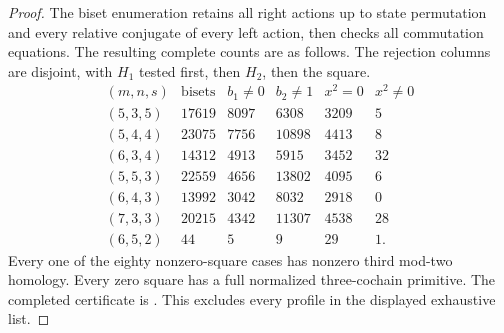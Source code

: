 \begin{proof}
The biset enumeration retains all right actions up to state
permutation and every relative conjugate of every left action,
then checks all commutation equations. The resulting complete
counts are as follows. The rejection columns are disjoint,
with $H_1$ tested first, then $H_2$, then the square.
\[
\begin{array}{c|rrrrr}
(m,n,s)&\text{bisets}&b_1\ne0&b_2\ne1&x^2=0&x^2\ne0\\\hline
(5,3,5)&17619&8097&6308&3209&5\\
(5,4,4)&23075&7756&10898&4413&8\\
(6,3,4)&14312&4913&5915&3452&32\\
(5,5,3)&22559&4656&13802&4095&6\\
(6,4,3)&13992&3042&8032&2918&0\\
(7,3,3)&20215&4342&11307&4538&28\\
(6,5,2)&44&5&9&29&1.
\end{array}
\]
Every one of the eighty nonzero-square cases has nonzero third
mod-two homology. Every zero square has a full normalized
three-cochain primitive. The completed certificate is
.
This excludes every profile in the displayed exhaustive list.
\end{proof}
